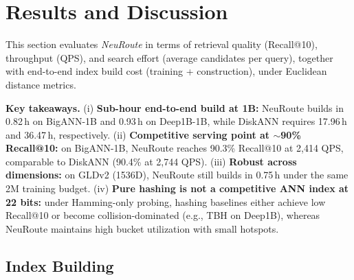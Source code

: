 \documentclass[sigconf, nonacm]{acmart}
\begin{document}
\section{Results and Discussion} \label{sec:results_discussion}

This section evaluates \textit{NeuRoute} in terms of retrieval quality (Recall@10), throughput (QPS), and search effort (average candidates per query), together with end-to-end index build cost (training + construction), under Euclidean distance metrics.

\textbf{Key takeaways.}
(i) \textbf{Sub-hour end-to-end build at 1B:} NeuRoute builds in 0.82\,h on BigANN-1B and 0.93\,h on Deep1B-1B, while DiskANN requires 17.96\,h and 36.47\,h, respectively.
(ii) \textbf{Competitive serving point at $\sim$90\% Recall@10:} on BigANN-1B, NeuRoute reaches 90.3\% Recall@10 at 2,414 QPS, comparable to DiskANN (90.4\% at 2,744 QPS).
(iii) \textbf{Robust across dimensions:} on GLDv2 (1536D), NeuRoute still builds in 0.75\,h under the same 2M training budget.
(iv) \textbf{Pure hashing is not a competitive ANN index at 22 bits:} under Hamming-only probing, hashing baselines either achieve low Recall@10 or become collision-dominated (e.g., TBH on Deep1B), whereas NeuRoute maintains high bucket utilization with small hotspots.



\subsection{Index Building}\label{sec:build-time}
\end{document}
